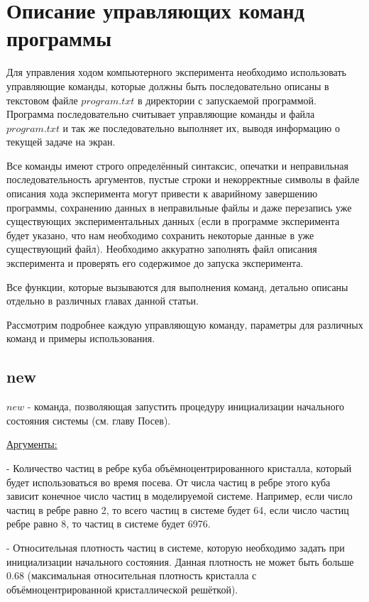 \documentclass[a4paper]{article}
\begin{document}
\newpage
\section{Описание управляющих команд программы}
Для управления ходом компьютерного эксперимента необходимо использовать управляющие команды, которые должны быть последовательно описаны в текстовом файле $ program.txt $ в директории с запускаемой программой. Программа последовательно считывает управляющие команды и файла $ program.txt $ и так же последовательно выполняет их, выводя информацию о текущей задаче на экран.

Все команды имеют строго определённый синтаксис, опечатки и неправильная последовательность аргументов, пустые строки и некорректные символы в файле описания хода эксперимента могут привести
к аварийному завершению программы, сохранению данных в неправильные файлы и даже перезапись уже существующих экспериментальных данных (если в программе эксперимента будет указано, что нам необходимо сохранить некоторые данные в уже существующий файл). Необходимо аккуратно заполнять файл описания эксперимента и проверять его содержимое до запуска эксперимента.

Все функции, которые вызываются для выполнения команд, детально описаны отдельно в различных главах данной статьи.

Рассмотрим подробнее каждую управляющую команду, параметры для различных команд и примеры использования.

\subsection{new}
$ new $ - команда, позволяющая запустить процедуру инициализации начального состояния системы (см. главу Посев). 

\uline{Аргументы:}

- Количество частиц в ребре куба объёмноцентрированного кристалла, который будет использоваться во время посева. От числа частиц в ребре этого куба зависит конечное число частиц в моделируемой системе. Например, если число частиц в ребре равно 2, то всего частиц в системе будет 64, если число частиц ребре равно 8, то частиц в системе будет 6976.

- Относительная плотность частиц в системе, которую необходимо задать при инициализации начального состояния. Данная плотность не может быть больше 0.68 (максимальная относительная плотность кристалла с объёмноцентрированной кристаллической решёткой).
\end{document}
